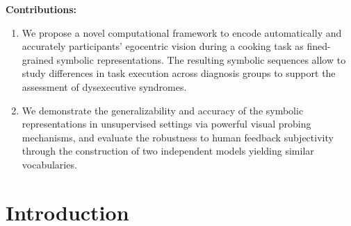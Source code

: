 \begin{chapterabstract}
\begin{enumerate}



    \end{enumerate}
    \textbf{Contributions:}
    \begin{enumerate}

         \item We propose a novel computational framework to encode automatically and accurately participants' egocentric vision during a cooking task as fined-grained symbolic representations. The resulting symbolic sequences allow to study differences in task execution across diagnosis groups to support the assessment of dysexecutive syndromes.

        \item We demonstrate the generalizability and accuracy of the symbolic representations in unsupervised settings via powerful visual probing mechanisms, and evaluate the robustness to human feedback subjectivity through the construction of two independent models yielding similar vocabularies.
        
        
    \end{enumerate}
\end{chapterabstract}



\section{Introduction} %
\label{sec:chapter_5_introduction}

